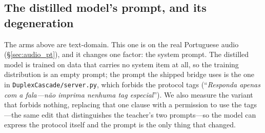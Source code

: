 \documentclass[conference]{IEEEtran}
\begin{document}
\subsection{The distilled model's prompt, and its degeneration}
\label{sec:abl_prompt}

The arms above are text-domain. This one is on the real Portuguese audio
(\S\ref{sec:audio_pt}), and it changes one factor: the system prompt. The
distilled model is trained on data that carries no system item at all, so the
training distribution is an empty prompt; the prompt the shipped bridge uses is
the one in \texttt{DuplexCascade/server.py}, which forbids the protocol tags
(``\emph{Responda apenas com a fala---não imprima nenhuma tag especial}'').
We also measure the variant that forbids nothing, replacing that one clause with
a permission to use the tags---the same edit that distinguishes the teacher's two
prompts---so the model can express the protocol itself and the prompt is the
only thing that changed.

\begin{table}[t]
\centering
\caption{The distilled model with and without a system prompt, on the rebuilt
Portuguese audio (727 scenarios each, read by \texttt{faster-whisper large-v3} in
Portuguese). The last three columns are the degeneration: the share of replies
opening with a stray non-Latin token, the mean reply length, and how many times
the model takes the floor.}
\label{tab:abl_prompt}
\footnotesize
{}
\end{table}
\end{document}
